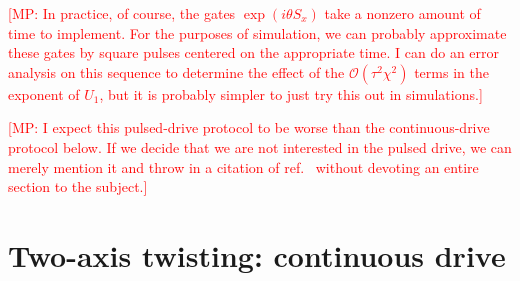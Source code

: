 \documentclass[aps,notitlepage,nofootinbib,11pt]{revtex4-1}
\newcommand{\p}[1]{\left(#1\right)} %
\renewcommand{\O}{\mathcal{O}}
\newcommand{\1}{\hat{\mathds{1}}}
\newcommand{\note}[1]{\textcolor{red}{#1}}
\begin{document}
\note{[MP: In practice, of course, the gates $\exp\p{i\theta S_x}$
  take a nonzero amount of time to implement.  For the purposes of
  simulation, we can probably approximate these gates by square pulses
  centered on the appropriate time.  I can do an error analysis on
  this sequence to determine the effect of the $\O\p{\tau^2\chi^2}$
  terms in the exponent of $U_1$, but it is probably simpler to just
  try this out in simulations.]}

\note{[MP: I expect this pulsed-drive protocol to be worse than the
  continuous-drive protocol below.  If we decide that we are not
  interested in the pulsed drive, we can merely mention it and throw
  in a citation of ref.~\cite{liu2011spin} without devoting an entire
  section to the subject.]}


\section{Two-axis twisting: continuous drive}
\end{document}
